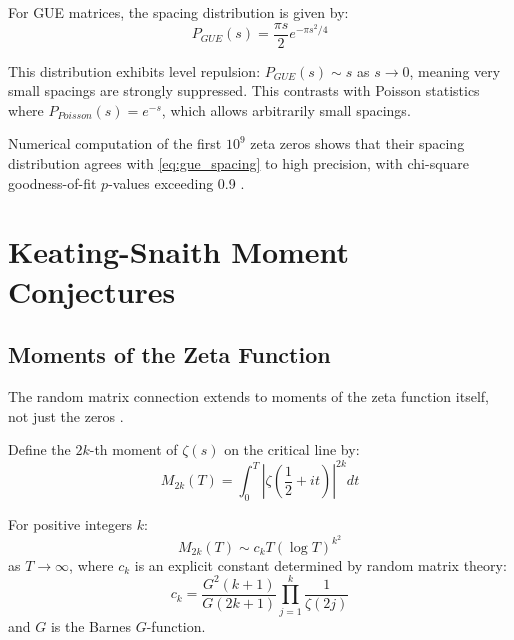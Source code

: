 \begin{theorem}
\label{thm:gue_spacing}
For GUE matrices, the spacing distribution is given by:
\begin{equation}
P_{GUE}(s) = \frac{\pi s}{2} e^{-\pi s^2/4}
\label{eq:gue_spacing}
\end{equation}
\end{theorem}

\begin{remark}
This distribution exhibits level repulsion: $P_{GUE}(s) \sim s$ as $s \to 0$, meaning very small spacings are strongly suppressed. This contrasts with Poisson statistics where $P_{Poisson}(s) = e^{-s}$, which allows arbitrarily small spacings.
\end{remark}

\begin{theorem}
\label{thm:zeta_spacing_numerics}
Numerical computation of the first $10^9$ zeta zeros shows that their spacing distribution agrees with \eqref{eq:gue_spacing} to high precision, with chi-square goodness-of-fit $p$-values exceeding 0.9 \cite{odlyzko1985}.
\end{theorem}

\section{Keating-Snaith Moment Conjectures}
\label{sec:keating_snaith}

\subsection{Moments of the Zeta Function}

The random matrix connection extends to moments of the zeta function itself, not just the zeros \cite{keatingsaith2000}.

\begin{definition}
\label{def:zeta_moments}
Define the $2k$-th moment of $\zeta(s)$ on the critical line by:
\begin{equation}
M_{2k}(T) = \int_0^T \left|\zeta\left(\frac{1}{2} + it\right)\right|^{2k} dt
\label{eq:zeta_moments}
\end{equation}
\end{definition}

\begin{conjecture}
\label{conj:keating_snaith}
For positive integers $k$:
\begin{equation}
M_{2k}(T) \sim c_k T (\log T)^{k^2}
\label{eq:keating_snaith}
\end{equation}
as $T \to \infty$, where $c_k$ is an explicit constant determined by random matrix theory:
\begin{equation}
c_k = \frac{G^2(k+1)}{G(2k+1)} \prod_{j=1}^{k} \frac{1}{\zeta(2j)}
\end{equation}
and $G$ is the Barnes $G$-function.
\end{conjecture}

